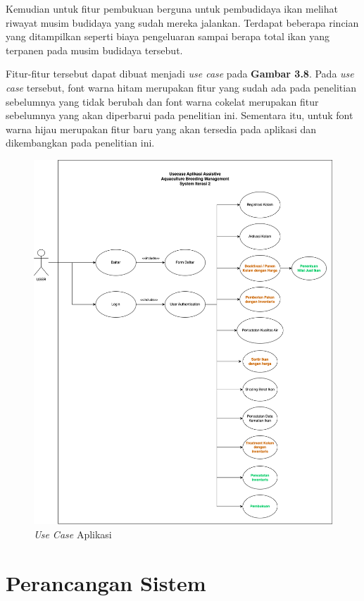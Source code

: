 Kemudian untuk fitur pembukuan berguna untuk pembudidaya ikan melihat riwayat musim budidaya yang sudah mereka jalankan. Terdapat beberapa rincian yang ditampilkan seperti biaya pengeluaran sampai berapa total ikan yang terpanen pada musim budidaya tersebut.

Fitur-fitur tersebut dapat dibuat menjadi \textit{use case} pada \textbf{Gambar 3.8}. Pada \textit{use case} tersebut, font warna hitam merupakan fitur yang sudah ada pada penelitian sebelumnya yang tidak berubah dan font warna cokelat merupakan fitur sebelumnya yang akan diperbarui pada penelitian ini. Sementara itu, untuk font warna hijau merupakan fitur baru yang akan tersedia pada aplikasi dan dikembangkan pada penelitian ini.

\begin{figure}[H]
	\centering
	\includegraphics[width=1\textwidth]{gambar/usecase_iterasi_2.png}
	\caption{\textit{Use Case} Aplikasi}
\end{figure}

\section{Perancangan Sistem}

